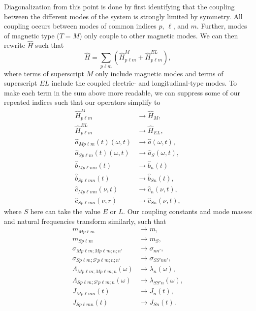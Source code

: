 \documentclass{article}
\begin{document}
Diagonalization from this point is done by first identifying that the coupling between the different modes of the system is strongly limited by symmetry. All coupling occurs between modes of common indices $p$, $\ell$, and $m$. Further, modes of magnetic type ($T = M$) only couple to other magnetic modes. We can then rewrite $\hat{H}$ such that
\begin{equation}
\hat{H} = \sum_{p\ell m}\left(\hat{H}_{p\ell m}^M + \hat{H}_{p\ell m}^{EL}\right),
\end{equation}
where terms of superscript $M$ only include magnetic modes and terms of superscript $EL$ include the coupled electric- and longitudinal-type modes. To make each term in the sum above more readable, we can suppress some of our repeated indices such that our operators simplify to
\begin{equation}
\begin{split}
\hat{H}_{p\ell m}^M&\to\hat{H}_M,\\
\hat{H}_{p\ell m}^{EL}&\to\hat{H}_{EL},\\
\hat{a}_{Mp\ell m}(t)(\omega,t)&\to\hat{a}(\omega,t),\\
\hat{a}_{Sp\ell m}(t)(\omega,t)&\to\hat{a}_{S}(\omega,t),\\
\hat{b}_{Mp\ell mn}(t)&\to\hat{b}_n(t)\\
\hat{b}_{Sp\ell mn}(t)&\to\hat{b}_{Sn}(t),\\
\hat{c}_{Mp\ell mn}(\nu,t)&\to\hat{c}_n(\nu,t),\\
\hat{c}_{Sp\ell mn}(\nu,r)&\to\hat{c}_{Sn}(\nu,t),
\end{split}
\end{equation}
where $S$ here can take the value $E$ or $L$. Our coupling constants and mode masses and natural frequencies transform similarly, such that
\begin{equation}
\begin{split}
m_{Mp\ell m}&\to m,\\
m_{Sp\ell m}&\to m_S,\\
\sigma_{Mp\ell m;Mp\ell m;n;n'}&\to \sigma_{nn'},\\
\sigma_{Sp\ell m;S'p\ell m;n;n'}&\to\sigma_{SS'nn'},\\
\Lambda_{Mp\ell m;Mp\ell m;n}(\omega)&\to\lambda_n(\omega),\\
\Lambda_{Sp\ell m;S'p\ell m;n}(\omega)&\to \lambda_{SS'n}(\omega),\\
J_{Mp\ell mn}(t)&\to J_n(t),\\
J_{Sp\ell mn}(t)&\to J_{Sn}(t).
\end{split}
\end{equation}
\end{document}
